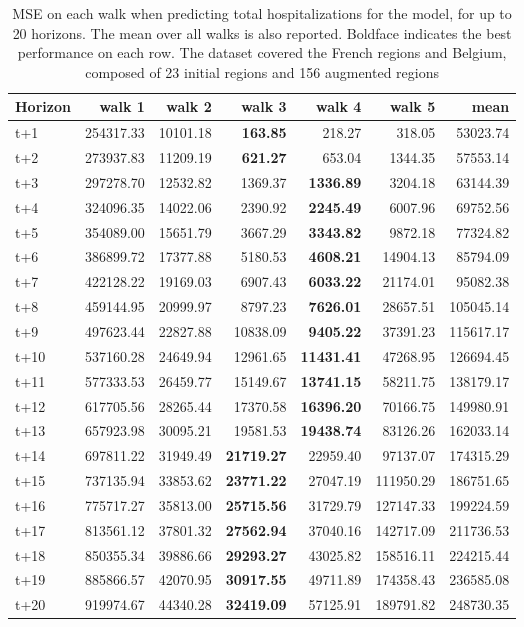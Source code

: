 \begin{table}[H]
\centering
\caption{MSE on each walk when predicting total hospitalizations for the model, for up to 20 horizons. The mean over all walks is also reported. Boldface indicates the best performance on each row. The dataset covered the French regions and Belgium, composed of 23 initial regions and 156 augmented regions }
\label{tab:MSE_walk_baseline}
\begin{tabular}{lrrrrrr}
\toprule
Horizon &    walk 1 &   walk 2 &   walk 3 &   walk 4 &    walk 5 &      mean \\
\midrule
t+1  & 254317.33  & 10101.18  & \textbf{163.85}  & 218.27  & 318.05  & 53023.74  \\
t+2  & 273937.83  & 11209.19  & \textbf{621.27}  & 653.04  & 1344.35  & 57553.14  \\
t+3  & 297278.70  & 12532.82  & 1369.37  & \textbf{1336.89}  & 3204.18  & 63144.39  \\
t+4  & 324096.35  & 14022.06  & 2390.92  & \textbf{2245.49}  & 6007.96  & 69752.56  \\
t+5  & 354089.00  & 15651.79  & 3667.29  & \textbf{3343.82}  & 9872.18  & 77324.82  \\
t+6  & 386899.72  & 17377.88  & 5180.53  & \textbf{4608.21}  & 14904.13  & 85794.09  \\
t+7  & 422128.22  & 19169.03  & 6907.43  & \textbf{6033.22}  & 21174.01  & 95082.38  \\
t+8  & 459144.95  & 20999.97  & 8797.23  & \textbf{7626.01}  & 28657.51  & 105045.14  \\
t+9  & 497623.44  & 22827.88  & 10838.09  & \textbf{9405.22}  & 37391.23  & 115617.17  \\
t+10  & 537160.28  & 24649.94  & 12961.65  & \textbf{11431.41}  & 47268.95  & 126694.45  \\
t+11  & 577333.53  & 26459.77  & 15149.67  & \textbf{13741.15}  & 58211.75  & 138179.17  \\
t+12  & 617705.56  & 28265.44  & 17370.58  & \textbf{16396.20}  & 70166.75  & 149980.91  \\
t+13  & 657923.98  & 30095.21  & 19581.53  & \textbf{19438.74}  & 83126.26  & 162033.14  \\
t+14  & 697811.22  & 31949.49  & \textbf{21719.27}  & 22959.40  & 97137.07  & 174315.29  \\
t+15  & 737135.94  & 33853.62  & \textbf{23771.22}  & 27047.19  & 111950.29  & 186751.65  \\
t+16  & 775717.27  & 35813.00  & \textbf{25715.56}  & 31729.79  & 127147.33  & 199224.59  \\
t+17  & 813561.12  & 37801.32  & \textbf{27562.94}  & 37040.16  & 142717.09  & 211736.53  \\
t+18  & 850355.34  & 39886.66  & \textbf{29293.27}  & 43025.82  & 158516.11  & 224215.44  \\
t+19  & 885866.57  & 42070.95  & \textbf{30917.55}  & 49711.89  & 174358.43  & 236585.08  \\
t+20  & 919974.67  & 44340.28  & \textbf{32419.09}  & 57125.91  & 189791.82  & 248730.35  \\

\bottomrule
\end{tabular}
\end{table}
